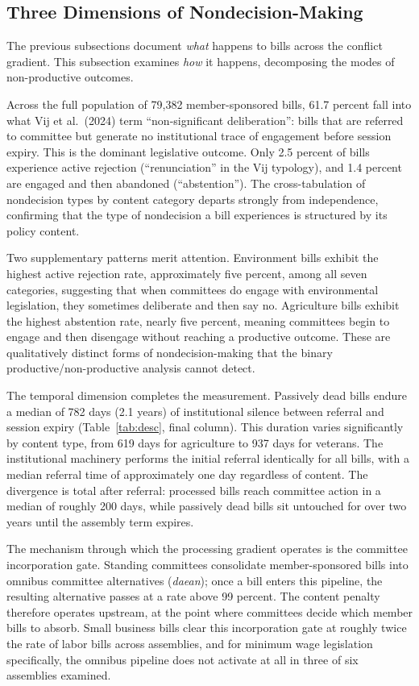 \documentclass[11pt]{article}
\begin{document}
\subsection{Three Dimensions of Nondecision-Making}
\label{sec:mechanism}

The previous subsections document \textit{what} happens to bills across the conflict gradient. This subsection examines \textit{how} it happens, decomposing the modes of non-productive outcomes.

Across the full population of 79,382 member-sponsored bills, 61.7 percent fall into what Vij et al.\ (2024) term ``non-significant deliberation'': bills that are referred to committee but generate no institutional trace of engagement before session expiry. This is the dominant legislative outcome. Only 2.5 percent of bills experience active rejection (``renunciation'' in the Vij typology), and 1.4 percent are engaged and then abandoned (``abstention''). The cross-tabulation of nondecision types by content category departs strongly from independence, confirming that the type of nondecision a bill experiences is structured by its policy content.

Two supplementary patterns merit attention. Environment bills exhibit the highest active rejection rate, approximately five percent, among all seven categories, suggesting that when committees do engage with environmental legislation, they sometimes deliberate and then say no. Agriculture bills exhibit the highest abstention rate, nearly five percent, meaning committees begin to engage and then disengage without reaching a productive outcome. These are qualitatively distinct forms of nondecision-making that the binary productive/non-productive analysis cannot detect.

The temporal dimension completes the measurement. Passively dead bills endure a median of 782 days (2.1 years) of institutional silence between referral and session expiry (Table~\ref{tab:desc}, final column). This duration varies significantly by content type, from 619 days for agriculture to 937 days for veterans. The institutional machinery performs the initial referral identically for all bills, with a median referral time of approximately one day regardless of content. The divergence is total after referral: processed bills reach committee action in a median of roughly 200 days, while passively dead bills sit untouched for over two years until the assembly term expires.

The mechanism through which the processing gradient operates is the committee incorporation gate. Standing committees consolidate member-sponsored bills into omnibus committee alternatives (\textit{daean}); once a bill enters this pipeline, the resulting alternative passes at a rate above 99 percent. The content penalty therefore operates upstream, at the point where committees decide which member bills to absorb. Small business bills clear this incorporation gate at roughly twice the rate of labor bills across assemblies, and for minimum wage legislation specifically, the omnibus pipeline does not activate at all in three of six assemblies examined.
\end{document}
